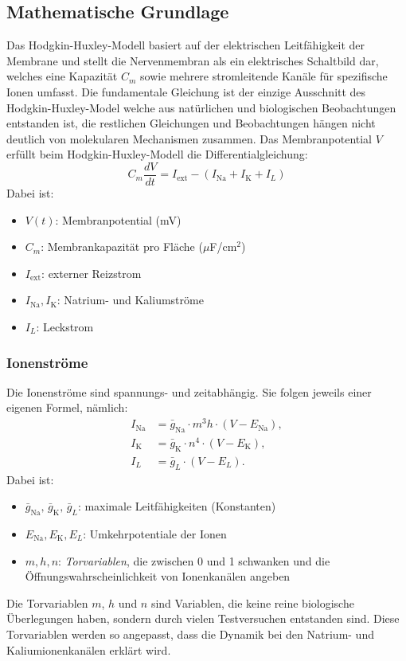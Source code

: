 \begin{refsection}
\subsection{Mathematische Grundlage}
Das Hodgkin-Huxley-Modell basiert auf der elektrischen Leitfähigkeit der Membrane und stellt die Nervenmembran als ein elektrisches Schaltbild dar, welches eine Kapazität $C_m$ sowie mehrere stromleitende Kanäle für spezifische Ionen umfasst.
Die fundamentale Gleichung ist der einzige Ausschnitt des Hodgkin-Huxley-Model welche aus natürlichen und biologischen Beobachtungen entstanden ist, die restlichen Gleichungen und Beobachtungen hängen nicht deutlich von molekularen Mechanismen zusammen. 
Das Membranpotential $V$ erfüllt beim Hodgkin-Huxley-Modell die Differentialgleichung: 
\[C_m \frac{dV}{dt} = I_{\text{ext}} - (I_{\text{Na}} + I_{\text{K}} + I_L)\] 
\noindent
Dabei ist:

\begin{itemize}
	\item $V(t)$: Membranpotential (mV)
	\item $C_m$: Membrankapazität pro Fläche ($\mu$F/cm$^2$)
	\item $I_{\text{ext}}$: externer Reizstrom
	\item $I_{\text{Na}}, I_{\text{K}}$: Natrium- und Kaliumströme
	\item $I_L$: Leckstrom
\end{itemize}
\subsubsection{Ionenströme}
Die Ionenströme sind spannungs- und zeitabhängig. Sie folgen jeweils einer eigenen Formel, nämlich:
\[
\begin{aligned}
	I_{\text{Na}} &= \bar{g}_{\text{Na}} \cdot m^3 h \cdot (V - E_{\text{Na}}), \\
	I_{\text{K}} &= \bar{g}_{\text{K}} \cdot n^4 \cdot (V - E_{\text{K}}), \\
	I_L &= \bar{g}_L \cdot (V - E_L).
\end{aligned}
\]
\noindent
Dabei ist:

\begin{itemize}
	\item $\bar{g}_{\text{Na}},\, \bar{g}_{\text{K}},\, \bar{g}_L$: maximale Leitfähigkeiten (Konstanten)
	\item $E_{\text{Na}}, E_{\text{K}}, E_L$: Umkehrpotentiale der Ionen
	\item $m, h, n$: \emph{Torvariablen}, die zwischen 0 und 1 schwanken und die Öffnungswahrscheinlichkeit von Ionenkanälen angeben
\end{itemize}
Die Torvariablen $m$, $h$ und $n$ sind Variablen, die keine reine biologische Überlegungen haben, sondern durch vielen Testversuchen entstanden sind. Diese Torvariablen werden so angepasst, dass die Dynamik bei den Natrium- und Kaliumionenkanälen erklärt wird.

\end{refsection}
